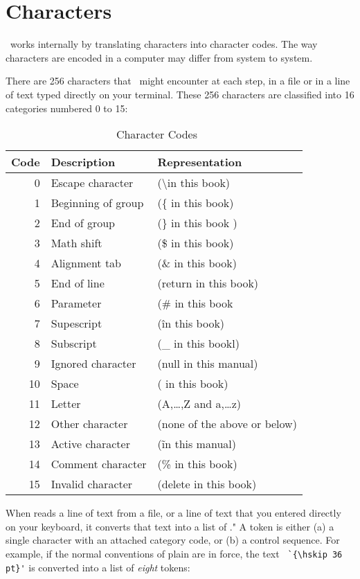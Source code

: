 \chapter{Characters}
\normalsize

\tex\ works internally by translating characters into character codes. The way characters are encoded in a computer
may differ from system to system. 


There are 256 characters that \tex\  might encounter at
each step, in a file or in a line of text typed directly on your terminal. These
256 characters are classified into 16 categories numbered 0 to 15:

\begin{table}[htbp]
\begin{tabular}{rll}
\toprule
Code & Description & Representation\\
\midrule
0 &  Escape character & (\textbackslash in this book)\\
1 & Beginning of group & (\{ in this book)\\
2 & End of group & (\} in this book )\\
3 & Math shift & (\$ in this book)\\
4 & Alignment tab & (\& in this book)\\
5 & End of line &(return in this book)\\
6 & Parameter &(\# in this book\\
7 & Supescript &(\^ in this book)\\
8 & Subscript &(\_ in this bookl)\\
9 & Ignored character &(null in this manual)\\
10 & Space &(\char32 in this book)\\
11 &Letter &(A,\ldots,Z and a,\ldots z)\\
12 &Other character &(none of the above or below)\\
13 &Active character &(\~ in this manual)\\
14 &Comment character &(\% in this book)\\
15 &Invalid character &(delete in this book)\\
\bottomrule
\end{tabular}
\caption{\tex\ Character Codes}
\end{table}
\medskip

When \tex reads a line of text from a file, or a line of text that you entered
directly on your keyboard, it converts that text into a list of ." A
token is either (a) a single character with an attached category code, or (b) a control
sequence. For example, if the normal conventions of plain \tex  are in force, the text
\verb*+ `{\hskip 36 pt}'+  is converted into a list of \textit{eight} tokens:
\medskip

